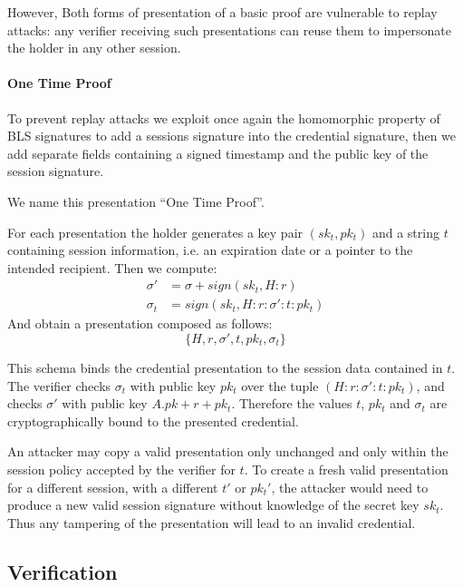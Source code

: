 However, Both forms of presentation of a basic proof are vulnerable to
replay attacks: any verifier receiving such presentations can reuse
them to impersonate the holder in any other session.

\paragraph{One Time Proof}

To prevent replay attacks we exploit once again the homomorphic
property of BLS signatures to add a sessions signature into the
credential signature, then we add separate fields containing a signed
timestamp and the public key of the session signature.

We name this presentation ``One Time Proof''.

For each presentation the holder generates a key pair $(sk_t, pk_t)$
and a string $t$ containing session information, i.e. an expiration
date or a pointer to the intended recipient. Then we compute:
\begin{equation*}
    \begin{split}
        \sigma' &= \sigma + sign(sk_t, H : r) \\
        \sigma_{t} &= sign(sk_t, H : r : \sigma' : t : pk_t)
    \end{split}
\end{equation*}
And obtain a presentation composed as follows:
\begin{equation*}
    \{H, r, \sigma', t, pk_t,  \sigma_t\}
\end{equation*}

This schema binds the credential presentation to the session data
contained in $t$. The verifier checks $\sigma_t$ with public key $pk_t$
over the tuple $(H : r : \sigma' : t : pk_t)$, and checks $\sigma'$
with public key $A.pk + r + pk_t$. Therefore the values $t$, $pk_t$
and $\sigma_t$ are cryptographically bound to the presented
credential.

An attacker may copy a valid presentation only unchanged and only
within the session policy accepted by the verifier for $t$. To create a
fresh valid presentation for a different session, with a different
$t'$ or $pk_t'$, the attacker would need to produce a new valid
session signature without knowledge of the secret key $sk_t$. Thus any
tampering of the presentation will lead to an invalid credential.

\subsection{Verification}

